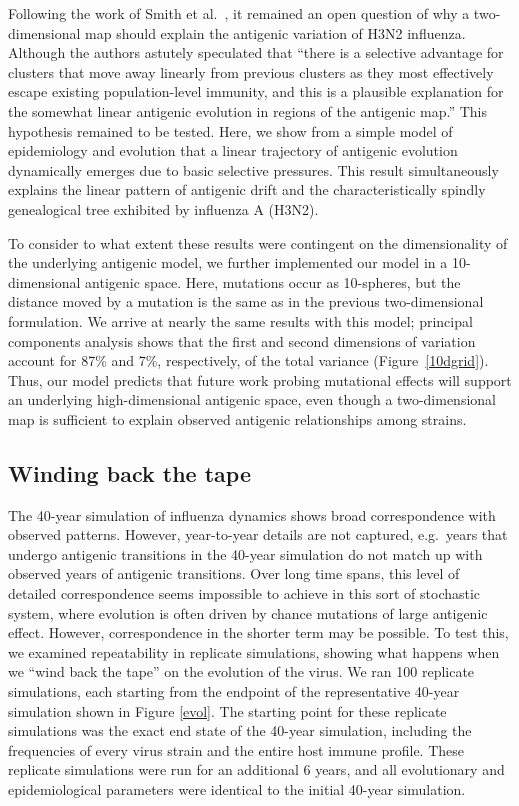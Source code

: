 \documentclass[11pt,oneside,letterpaper]{article}
\begin{document}
Following the work of Smith et al.\ \cite{Smith04}, it remained an open question of why a two-dimensional map should explain the antigenic variation of H3N2 influenza.  Although the authors astutely speculated that ``there is a selective advantage for clusters that move away linearly from previous clusters as they most effectively escape existing population-level immunity, and this is a plausible explanation for the somewhat linear antigenic evolution in regions of the antigenic map.''  This hypothesis remained to be tested.  Here, we show from a simple model of epidemiology and evolution that a linear trajectory of antigenic evolution dynamically emerges due to basic selective pressures.  This result simultaneously explains the linear pattern of antigenic drift \cite{Smith04} and the characteristically spindly genealogical tree \cite{Fitch97} exhibited by influenza A (H3N2).

To consider to what extent these results were contingent on the dimensionality of the underlying antigenic model, we further implemented our model in a 10-dimensional antigenic space.  Here, mutations occur as 10-spheres, but the distance moved by a mutation is the same as in the previous two-dimensional formulation.  We arrive at nearly the same results with this model; principal components analysis shows that the first and second dimensions of variation account for 87\% and 7\%, respectively, of the total variance (Figure~\ref{10dgrid}).  Thus, our model predicts that future work probing mutational effects will support an underlying high-dimensional antigenic space, even though a two-dimensional map is sufficient to explain observed antigenic relationships among strains.

\subsection*{Winding back the tape}

The 40-year simulation of influenza dynamics shows broad correspondence with observed patterns. However, year-to-year details are not captured, e.g.\ years that undergo antigenic transitions in the 40-year simulation do not match up with observed years of antigenic transitions.  Over long time spans, this level of detailed correspondence seems impossible to achieve in this sort of stochastic system, where evolution is often driven by chance mutations of large antigenic effect.  However, correspondence in the shorter term may be possible.  To test this, we examined repeatability in replicate simulations, showing what happens when we ``wind back the tape'' \cite{GouldWonderfulLife} on the evolution of the virus.  We ran 100 replicate simulations, each starting from the endpoint of the representative 40-year simulation shown in Figure \ref{evol}.  The starting point for these replicate simulations was the exact end state of the 40-year simulation, including the frequencies of every virus strain and the entire host immune profile.  These replicate simulations were run for an additional 6 years, and all evolutionary and epidemiological parameters were identical to the initial 40-year simulation.  
\end{document}
